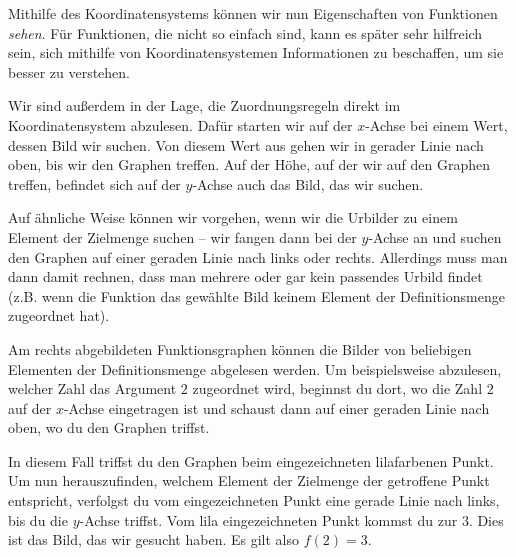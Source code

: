 \documentclass[../../main.tex]{subfiles}
\begin{document}
Mithilfe des Koordinatensystems können wir nun Eigenschaften von Funktionen \emph{sehen}. Für Funktionen, die nicht so einfach sind, kann es später sehr hilfreich sein, sich mithilfe von Koordinatensystemen Informationen zu beschaffen, um sie besser zu verstehen.

Wir sind außerdem in der Lage, die Zuordnungsregeln direkt im Koordinatensystem abzulesen. Dafür starten wir auf der $x$-Achse bei einem Wert, dessen Bild wir suchen. Von diesem Wert aus gehen wir in gerader Linie nach oben, bis wir den Graphen treffen. Auf der Höhe, auf der wir auf den Graphen treffen, befindet sich auf der $y$-Achse auch das Bild, das wir suchen.

Auf ähnliche Weise können wir vorgehen, wenn wir die Urbilder zu einem Element der Zielmenge suchen -- wir fangen dann bei der $y$-Achse an und suchen den Graphen auf einer geraden Linie nach links oder rechts. Allerdings muss man dann damit rechnen, dass man mehrere oder gar kein passendes Urbild findet (z.B. wenn die Funktion das gewählte Bild keinem Element der Definitionsmenge zugeordnet hat).

\begin{example}{}

    Am rechts abgebildeten Funktionsgraphen können die Bilder von beliebigen Elementen der Definitionsmenge abgelesen werden. Um beispielsweise abzulesen, welcher Zahl das Argument $2$ zugeordnet wird, beginnst du dort, wo die Zahl $2$ auf der $x$-Achse eingetragen ist und schaust dann auf einer geraden Linie nach oben, wo du den Graphen triffst.
    
    In diesem Fall triffst du den Graphen beim eingezeichneten lilafarbenen Punkt. Um nun herauszufinden, welchem Element der Zielmenge der getroffene Punkt entspricht, verfolgst du vom eingezeichneten Punkt eine gerade Linie nach links, bis du die $y$-Achse triffst. Vom lila eingezeichneten Punkt kommst du zur $3$. Dies ist das Bild, das wir gesucht haben. Es gilt also $f(2)=3$.
\end{example}
\end{document}
